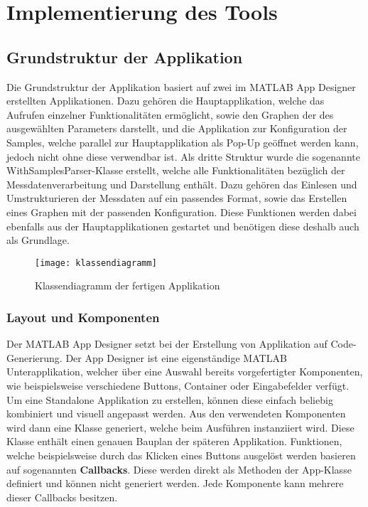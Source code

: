 
\chapter{Implementierung des Tools}

\section{Grundstruktur der Applikation}

Die Grundstruktur der Applikation basiert auf zwei im MATLAB App Designer erstellten Applikationen. Dazu gehören die Hauptapplikation, welche das Aufrufen einzelner Funktionalitäten ermöglicht, sowie den Graphen der des ausgewählten Parameters darstellt, und die Applikation zur Konfiguration der Samples, welche parallel zur Hauptapplikation als Pop-Up geöffnet werden kann, jedoch nicht ohne diese verwendbar ist. Als dritte Struktur wurde die sogenannte WithSamplesParser-Klasse erstellt, welche alle Funktionalitäten bezüglich der Messdatenverarbeitung und Darstellung enthält. Dazu gehören das Einlesen und Umstrukturieren der Messdaten auf ein passendes Format, sowie das Erstellen eines Graphen mit der passenden Konfiguration. Diese Funktionen werden dabei ebenfalls aus der Hauptapplikationen gestartet und benötigen diese deshalb auch als Grundlage.

\begin{figure}[H]
	\centering
	\texttt{[image: klassendiagramm]}
	\caption{Klassendiagramm der fertigen Applikation}
	\label{fig:klassendiagramm}
\end{figure}

\subsection{Layout und Komponenten}

Der MATLAB App Designer setzt bei der Erstellung von Applikation auf Code-Generierung. Der App Designer ist eine eigenständige MATLAB Unterapplikation, welcher über eine Auswahl bereits vorgefertigter Komponenten, wie beispielsweise verschiedene Buttons, Container oder Eingabefelder verfügt. Um eine Standalone Applikation zu erstellen, können diese einfach beliebig kombiniert und visuell angepasst werden. Aus den verwendeten Komponenten wird dann eine Klasse generiert, welche beim Ausführen instanziiert wird. Diese Klasse enthält einen genauen \glqq Bauplan\grqq{} der späteren Applikation. Funktionen, welche beispielsweise durch das Klicken eines Buttons ausgelöst werden basieren auf sogenannten \textbf{Callbacks}. Diese werden direkt als Methoden der App-Klasse definiert und können nicht generiert werden. Jede Komponente kann mehrere dieser Callbacks besitzen.


